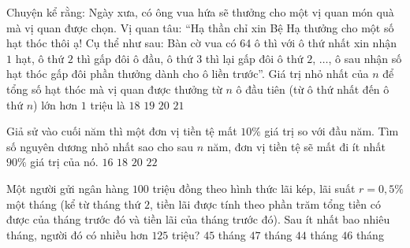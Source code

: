 \begin{ex}%
	Chuyện kể rằng: Ngày xưa, có ông vua hứa sẽ thưởng cho một vị quan món quà mà vị quan được chọn. Vị quan tâu: “Hạ thần chỉ xin Bệ Hạ thưởng cho một số hạt thóc thôi ạ! Cụ thể như sau: Bàn cờ vua có 64 ô thì với ô thứ nhất xin nhận $1$ hạt, ô thứ $2$ thì gấp đôi ô đầu, ô thứ $3$ thì lại gấp đôi ô thứ $2$, $\ldots$, ô sau nhận số hạt thóc gấp đôi phần thưởng dành cho ô liền trước”. Giá trị nhỏ nhất của $n$ để tổng số hạt thóc mà vị quan được thưởng từ $n$ ô đầu tiên (từ ô thứ nhất đến ô thứ $n$) lớn hơn $1$ triệu là
	\choice
	{$18$}
	{$19$}
	{\True $20$}
	{$21$}
\end{ex}
\begin{ex}%
	Giả sử vào cuối năm thì một đơn vị tiền tệ mất $10\%$ giá trị so với đầu năm. Tìm số nguyên dương nhỏ nhất sao cho sau $n$ năm, đơn vị tiền tệ sẽ mất đi ít nhất $90\%$ giá trị của nó.
	\choice
	{$16$}
	{$18$}
	{$20$}
	{\True $22$}
\end{ex}
\begin{ex}%
	Một người gửi ngân hàng $100$ triệu đồng theo hình thức lãi kép, lãi suất $r=0{,}5\%$ một tháng (kể từ tháng thứ $2$, tiền lãi được tính theo phần trăm tổng tiền có được của tháng trước đó và tiền lãi của tháng trước đó). Sau ít nhất bao nhiêu tháng, người đó có nhiều hơn $125$ triệu?
	\choice
	{\True $45$ tháng}
	{$47$ tháng}
	{$44$ tháng}
	{$46$ tháng}
\end{ex}
